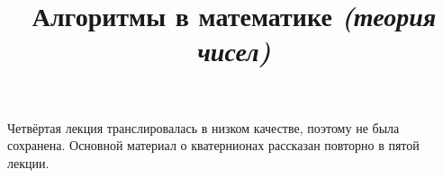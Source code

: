 



\title{Алгоритмы в математике \textit{(теория чисел)}}
\maketitle

\tableofcontents




\begin{remark}
    Четвёртая лекция транслировалась в низком качестве, поэтому не была сохранена.
    Основной материал о кватернионах рассказан повторно в пятой лекции.
\end{remark}










